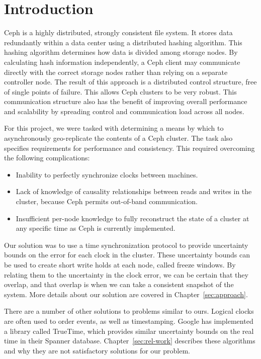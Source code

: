 \chapter{Introduction}
\label{sec:introduction}

Ceph is a highly distributed, strongly consistent file system. It
stores data redundantly within a data center using a distributed hashing
algorithm. This hashing algorithm determines how data is divided among
storage nodes.  By calculating hash information independently, a Ceph
client may communicate directly with the correct storage nodes rather
than relying on a separate controller node. The result of this
approach is a distributed control structure, free of single points of
failure. This allows Ceph clusters to be very robust. This
communication structure also has the benefit of improving overall
performance and scalability by spreading control and communication
load across all nodes.

For this project, we were tasked with determining a means by which to
asynchronously geo-replicate the contents of a Ceph cluster. The task
also specifies requirements for performance and consistency. This
required overcoming the following complications:

\begin{itemize}
\item Inability to perfectly synchronize clocks between machines.
\item Lack of knowledge of causality relationships between reads and
  writes in the cluster, because Ceph permits out-of-band
  communication.
\item Insufficient per-node knowledge to fully reconstruct the state
  of a cluster at any specific time as Ceph is currently implemented.
\end{itemize}

Our solution was to use a time synchronization protocol to provide
uncertainty bounds on the error for each clock in the cluster. These
uncertainty bounds can be used to create short write holds at each node, 
called freeze windows. By relating them to the uncertainty in the clock error,
we can be certain that they overlap, and that overlap is when we can take a
consistent snapshot of the system. More details about our solution are covered 
in Chapter~\ref{sec:approach}.

There are a number of other solutions to problems similar to ours. Logical
clocks are often used to order events, as well as timestamping. Google has
implemented a library called TrueTime, which provides similar uncertainty
bounds on the real time in their Spanner database. Chapter~\ref{sec:rel-work} 
describes these algorithms and why they are not satisfactory solutions for our 
problem.

